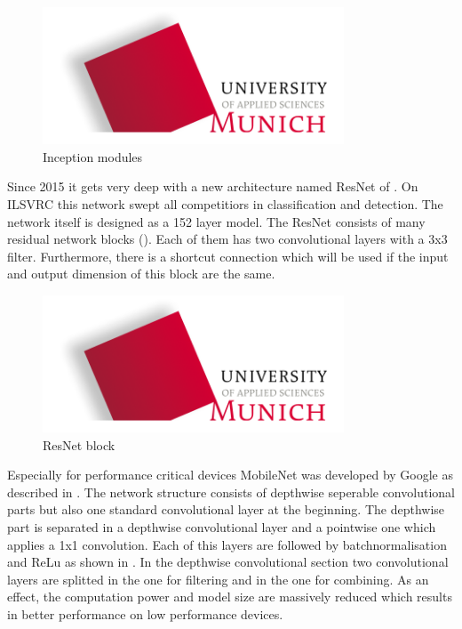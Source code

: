 \begin{figure}[htbp]
\includegraphics[width=0.8\textwidth]{includes/MUASlogo}
\caption[Inception modules]{Inception modules \citep{Szegedy2014}}
\label{fig:FH-Logo5}
\end{figure}

Since 2015 it gets very deep with a new architecture named ResNet of \citet{HE2015}. On ILSVRC this network swept all competitiors in classification and detection. The network itself is designed as a 152 layer model. The ResNet consists of many residual network blocks (). Each of them has two convolutional layers with a 3x3 filter. Furthermore, there is a shortcut connection which will be used if the input and output dimension of this block are the same.

\begin{figure}[htbp]
\includegraphics[width=0.8\textwidth]{includes/MUASlogo}
\caption[ResNet block]{ResNet block \citep{HE2015}}
\label{fig:FH-Logo6}
\end{figure}

Especially for performance critical devices MobileNet was developed by Google as described in \citet{Howard2017}.
The network structure consists of depthwise seperable convolutional parts but also one standard convolutional layer at the beginning. The depthwise part is separated in a depthwise convolutional layer and a pointwise one which applies a 1x1 convolution. Each of this layers are followed by batchnormalisation and ReLu as shown in . In the depthwise convolutional section two convolutional layers are splitted in the one for filtering and in the one for combining. As an effect, the computation power and model size are massively reduced which results in better performance on low performance devices.

